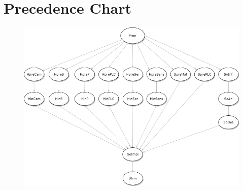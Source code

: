\documentclass
[
 12pt, %
       DIV12,
       a4paper, %
       oneside, %
       titlepage, %
       parskip=half, %
       headings=normal, %
       listof=totoc, %
       bibliography=totoc, %
       index=totoc, %
       captions=tableheading, %
       ]{scrreprt}
\begin{document}
\chapter{Precedence Chart}
\begin{figure}[h]
	\centering
	\includegraphics[width=\textwidth]{images/precedenceChart}
\end{figure}
\end{document}
